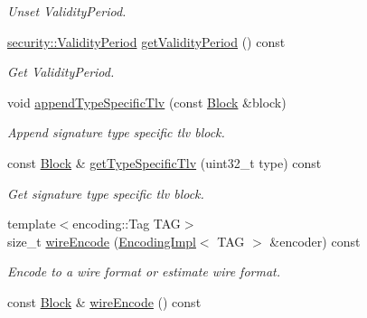 \begin{DoxyCompactItemize}
\begin{DoxyCompactList}\small\item\em Unset Validity\+Period. \end{DoxyCompactList}\item 
\hyperlink{classndn_1_1security_1_1ValidityPeriod}{security\+::\+Validity\+Period} \hyperlink{classndn_1_1SignatureInfo_a448df83a436b270047a7ca0659f2ef37}{get\+Validity\+Period} () const\hypertarget{classndn_1_1SignatureInfo_a448df83a436b270047a7ca0659f2ef37}{}\label{classndn_1_1SignatureInfo_a448df83a436b270047a7ca0659f2ef37}

\begin{DoxyCompactList}\small\item\em Get Validity\+Period. \end{DoxyCompactList}\item 
void \hyperlink{classndn_1_1SignatureInfo_ac0f120cb1e103e8d7d674cbe84e90714}{append\+Type\+Specific\+Tlv} (const \hyperlink{classndn_1_1Block}{Block} \&block)\hypertarget{classndn_1_1SignatureInfo_ac0f120cb1e103e8d7d674cbe84e90714}{}\label{classndn_1_1SignatureInfo_ac0f120cb1e103e8d7d674cbe84e90714}

\begin{DoxyCompactList}\small\item\em Append signature type specific tlv block. \end{DoxyCompactList}\item 
const \hyperlink{classndn_1_1Block}{Block} \& \hyperlink{classndn_1_1SignatureInfo_a11c024fe6ff967931c2fa8c142b98693}{get\+Type\+Specific\+Tlv} (uint32\+\_\+t type) const
\begin{DoxyCompactList}\small\item\em Get signature type specific tlv block. \end{DoxyCompactList}\item 
{\footnotesize template$<$encoding\+::\+Tag T\+AG$>$ }\\size\+\_\+t \hyperlink{classndn_1_1SignatureInfo_a48a43b0465f2ec02964c179c9ce69a7f}{wire\+Encode} (\hyperlink{classndn_1_1encoding_1_1EncodingImpl}{Encoding\+Impl}$<$ T\+AG $>$ \&encoder) const\hypertarget{classndn_1_1SignatureInfo_a48a43b0465f2ec02964c179c9ce69a7f}{}\label{classndn_1_1SignatureInfo_a48a43b0465f2ec02964c179c9ce69a7f}

\begin{DoxyCompactList}\small\item\em Encode to a wire format or estimate wire format. \end{DoxyCompactList}\item 
const \hyperlink{classndn_1_1Block}{Block} \& \hyperlink{classndn_1_1SignatureInfo_af1badd1d49f7cb139c3ce8f925f5f61c}{wire\+Encode} () const\hypertarget{classndn_1_1SignatureInfo_af1badd1d49f7cb139c3ce8f925f5f61c}{}\label{classndn_1_1SignatureInfo_af1badd1d49f7cb139c3ce8f925f5f61c}


\end{DoxyCompactItemize}
